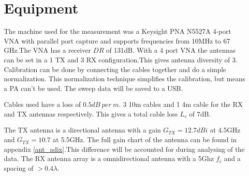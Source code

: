 \section{Equipment}\label{equipment}
The machine used for the measurement was a Keysight PNA N5527A 4-port VNA with parallel port capture and supports frequencies from 10MHz to 67 GHz.The VNA has a receiver $DR$ of 131dB. With a 4 port VNA the antennas can be set in a 1 TX and 3 RX configuration.This gives antenna diversity of 3. Calibration can be done by connecting the cables together and do a simple normalization. This normalization technique simplifies the calibration, but means a \gls{PA} can't be used.  The sweep data will be saved to a USB.


Cables used have a loss of $0.5dB  \ per \ m$. 3 10m cables and 1 4m cable for the RX and TX antennas respectively. This gives a total cable loss $L_c$ of 7dB.


The TX antenna is a directional antenna with a gain $G_{TX}=12.7dBi$ at 4.5GHz and $G_{TX}=10.7$ at 5.5GHz. The full gain chart of the antenna can be found in appendix \ref{ant_adix}.This difference will be accounted for during analysing of the data. The RX antenna array is a omnidirectional antenna with a 5Ghz $f_c$ and a spacing of $>0.4 \lambda$.

